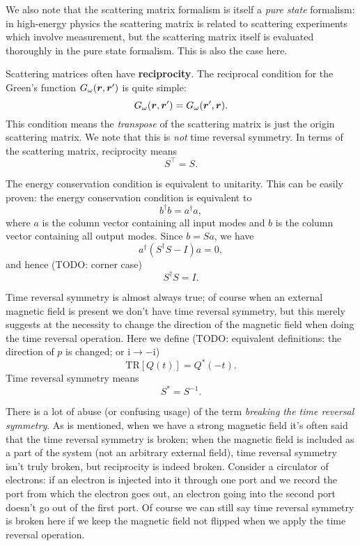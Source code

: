 \documentclass[hyperref, a4paper]{article}
\newcommand*{\ii}{\mathrm{i}}
\newcommand*{\concept}[1]{{\textbf{#1}}}
\newcommand*{\term}[1]{\textit{#1}}
\begin{document}
We also note that the scattering matrix formalism 
is itself a \emph{pure state} formalism:
in high-energy physics the scattering matrix is related to scattering experiments 
which involve measurement, 
but the scattering matrix itself is evaluated thoroughly in the pure state formalism.
This is also the case here.

Scattering matrices often have \concept{reciprocity}.
The reciprocal condition for the Green's function ${G}_\omega(\vb*{r}, \vb*{r}')$ is quite simple:
\begin{equation}
    G_\omega (\vb*{r}, \vb*{r}') = G_\omega (\vb*{r}', \vb*{r}).
\end{equation}
This condition means the \emph{transpose} of the scattering matrix is just the origin scattering matrix.
We note that this is \emph{not} time reversal symmetry.
In terms of the scattering matrix, reciprocity means 
\begin{equation}
    S^\top = S.
\end{equation}

The energy conservation condition is equivalent to unitarity.
This can be easily proven: the energy conservation condition is equivalent to  
\begin{equation}
    b^\dagger b = a^\dagger a,
\end{equation}
where $a$ is the column vector containing all input modes 
and $b$ is the column vector containing all output modes.
Since $b = S a$, we have 
\begin{equation}
    a^\dagger (S^\dagger S - I) a = 0,
\end{equation}
and hence (TODO: corner case)
\begin{equation}
    S^\dagger S = I.
\end{equation}

Time reversal symmetry is almost always true; 
of course when an external magnetic field is present 
we don't have time reversal symmetry, 
but this merely suggests at the necessity to change the direction of the magnetic field 
when doing the time reversal operation.
Here we define (TODO: equivalent definitions: the direction of $p$ is changed; or $\ii \to - \ii$)
\begin{equation}
    \mathrm{TR}[Q(t)] = Q^*(-t).
\end{equation}
Time reversal symmetry means 
\begin{equation}
    S^* = S^{-1}.
\end{equation}

There is a lot of abuse (or confusing usage) of the term \term{breaking the time reversal symmetry}.
As is mentioned, when we have a strong magnetic field 
it's often said that the time reversal symmetry is broken; 
when the magnetic field is included as a part of the system 
(not an arbitrary external field), 
time reversal symmetry isn't truly broken, 
but reciprocity is indeed broken.
Consider a circulator of electrons: 
if an electron is injected into it through one port 
and we record the port from which the electron goes out, 
an electron going into the second port doesn't go out of the first port.
Of course we can still say time reversal symmetry is broken here 
if we keep the magnetic field not flipped when we apply the time reversal operation. 
\end{document}

